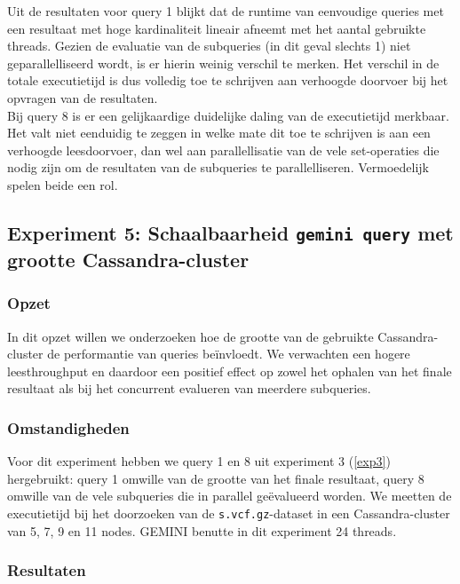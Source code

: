 Uit de resultaten voor query 1 blijkt dat de runtime van eenvoudige queries met een resultaat met hoge kardinaliteit lineair afneemt met het aantal gebruikte threads. Gezien de evaluatie van de subqueries (in dit geval slechts 1) niet geparallelliseerd wordt, is er hierin weinig verschil te merken. Het verschil in de totale executietijd is dus volledig toe te schrijven aan verhoogde doorvoer bij het opvragen van de resultaten.\\
Bij query 8 is er een gelijkaardige duidelijke daling van de executietijd merkbaar. Het valt niet eenduidig te zeggen in welke mate dit toe te schrijven is aan een verhoogde leesdoorvoer, dan wel aan parallellisatie van de vele set-operaties die nodig zijn om de resultaten van de subqueries te parallelliseren. Vermoedelijk spelen beide een rol.

\subsection{Experiment 5: Schaalbaarheid \texttt{gemini query} met grootte Cassandra-cluster}
\label{exp5}

\subsubsection{Opzet}

In dit opzet willen we onderzoeken hoe de grootte van de gebruikte Cassandra-cluster de performantie van queries be\"invloedt. We verwachten een hogere leesthroughput en daardoor een positief effect op zowel het ophalen van het finale resultaat als bij het concurrent evalueren van meerdere subqueries.

\subsubsection{Omstandigheden}

Voor dit experiment hebben we query 1 en 8 uit experiment 3 (\ref{exp3}) hergebruikt: query 1 omwille van de grootte van het finale resultaat, query 8 omwille van de vele subqueries die in parallel ge\"evalueerd worden. We meetten de executietijd bij het doorzoeken van de \texttt{s.vcf.gz}-dataset in een Cassandra-cluster van 5, 7, 9 en 11 nodes. GEMINI benutte in dit experiment 24 threads.

\subsubsection{Resultaten}

